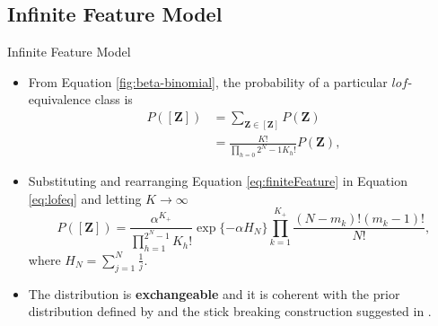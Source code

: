 \documentclass[aspectratio=169,xcolor=dvipsnames]{beamer}
\newcommand{\matz}{\textbf{Z}}
\begin{document}
\subsection{Infinite Feature Model}
\begin{frame}{Infinite Feature Model}
\setlength{\leftmargini}{0.2cm}
\vspace{-5pt}
\begin{itemize}
\item From Equation \ref{fig:beta-binomial}, the probability of a particular $lof$-equivalence class is
\begin{align}
    P([\matz]) &= \sum_{\matz \in [\matz]} P(\matz) \nonumber\\
    &= \frac{K!}{\prod_{h=0}{2^N-1}K_h!} P(\matz), \label{eq:lofeq}
\end{align}
\item Substituting and rearranging Equation \ref{eq:finiteFeature} in Equation \ref{eq:lofeq} and letting $K\rightarrow \infty$
\begin{equation}
    P([\matz]) = \frac{\alpha^{K_+}}{\prod_{h=1}^{2^N-1}K_h!} \exp\{-\alpha H_N\} \prod_{k=1}^{K_+}\frac{(N-m_k)!(m_k-1)!}{N!}, \label{eq:infFeat}
\end{equation}
where $H_N=\sum_{j=1}^{N}\frac{1}{j}$.
\item The distribution is \textbf{exchangeable} and it is coherent with the prior distribution defined by \cite{Hjort_1990} and the stick breaking construction suggested in \cite{hjort_2007}.
\end{itemize}
\end{frame}
\end{document}
